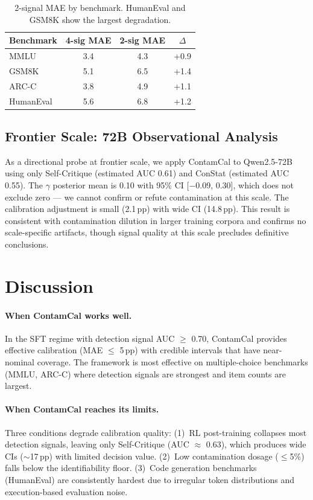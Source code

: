 \documentclass[letterpaper,11pt]{article}
\begin{document}
\begin{table}[t]
\centering
\caption{2-signal MAE by benchmark. HumanEval and GSM8K show the largest degradation.}
\label{tab:2signal_bench}
\small
\begin{tabular}{lccc}
\toprule
Benchmark & 4-sig MAE & 2-sig MAE & $\Delta$ \\
\midrule
MMLU & 3.4 & 4.3 & +0.9 \\
GSM8K & 5.1 & 6.5 & +1.4 \\
ARC-C & 3.8 & 4.9 & +1.1 \\
HumanEval & 5.6 & 6.8 & +1.2 \\
\bottomrule
\end{tabular}
\end{table}

\subsection{Frontier Scale: 72B Observational Analysis}
\label{sec:72b}

As a directional probe at frontier scale, we apply ContamCal to Qwen2.5-72B using only Self-Critique (estimated AUC 0.61) and ConStat (estimated AUC 0.55). The $\gamma$ posterior mean is 0.10 with 95\% CI [$-$0.09, 0.30], which does not exclude zero --- we cannot confirm or refute contamination at this scale. The calibration adjustment is small (2.1\,pp) with wide CI (14.8\,pp). This result is consistent with contamination dilution in larger training corpora and confirms no scale-specific artifacts, though signal quality at this scale precludes definitive conclusions.

\section{Discussion}

\paragraph{When ContamCal works well.}
In the SFT regime with detection signal AUC $\geq$ 0.70, ContamCal provides effective calibration (MAE $\leq$ 5\,pp) with credible intervals that have near-nominal coverage. The framework is most effective on multiple-choice benchmarks (MMLU, ARC-C) where detection signals are strongest and item counts are largest.

\paragraph{When ContamCal reaches its limits.}
Three conditions degrade calibration quality: (1)~RL post-training collapses most detection signals, leaving only Self-Critique (AUC $\approx$ 0.63), which produces wide CIs ($\sim$17\,pp) with limited decision value. (2)~Low contamination dosage ($\leq$5\%) falls below the identifiability floor. (3)~Code generation benchmarks (HumanEval) are consistently hardest due to irregular token distributions and execution-based evaluation noise.
\end{document}
